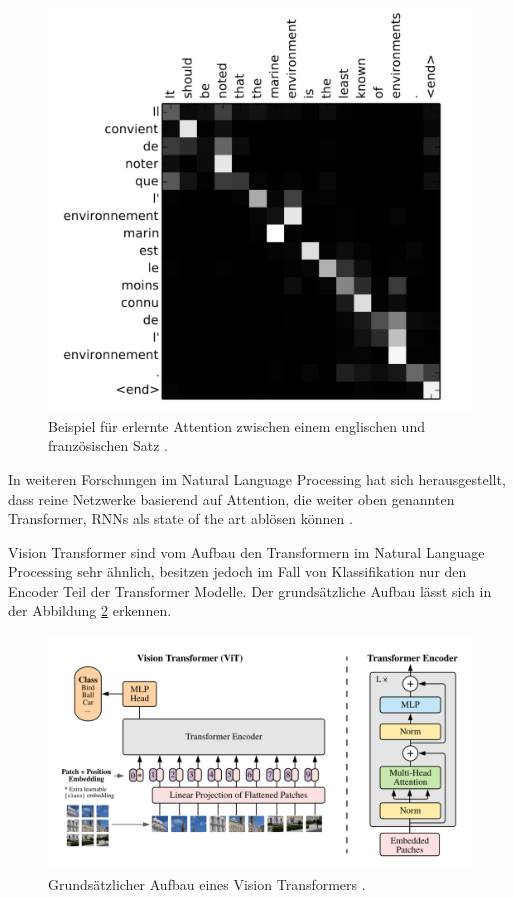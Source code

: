 \documentclass[twoside,a4paper]{IEEEtran}
\begin{document}
\begin{figure}[!htb]
	\includegraphics[width=\columnwidth]{attention_visualized}
	\caption{Beispiel für erlernte Attention zwischen einem englischen und französischen Satz \cite[S.6]{RNN_ATTENTION}.}
	\label{bild1}
\end{figure}


In weiteren Forschungen im Natural Language Processing hat sich herausgestellt, dass reine Netzwerke basierend auf Attention, die weiter oben genannten Transformer, RNNs als state of the art ablösen können \cite[S.2]{TRANSFORMERS}. 

Vision Transformer sind vom Aufbau den Transformern im Natural Language Processing sehr ähnlich, besitzen jedoch im Fall von Klassifikation nur den Encoder Teil der Transformer Modelle. Der grundsätzliche Aufbau lässt sich in der Abbildung \ref{vitimg} erkennen.

\begin{figure}[!htb]
	\includegraphics[width=\columnwidth]{vitimg}
	\caption{Grundsätzlicher Aufbau eines Vision Transformers \cite[S.3]{VIT}.}
	\label{vitimg}
\end{figure}
\end{document}
